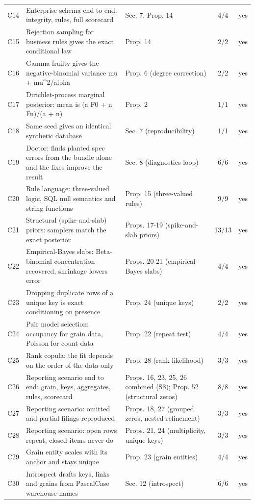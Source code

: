 \begin{longtable}{@{}l p{8.2cm} p{3.6cm} c r@{}}
C14 & Enterprise schema end to end: integrity, rules, full scorecard & Sec. 7, Prop. 14 & 4/4 & yes \\
C15 & Rejection sampling for business rules gives the exact conditional law & Prop. 14 & 2/2 & yes \\
C16 & Gamma frailty gives the negative-binomial variance mu + mu\^{}2/alpha & Prop. 6 (degree correction) & 2/2 & yes \\
C17 & Dirichlet-process marginal posterior: mean is (a F0 + n Fn)/(a + n) & Prop. 2 & 1/1 & yes \\
C18 & Same seed gives an identical synthetic database & Sec. 7 (reproducibility) & 1/1 & yes \\
C19 & Doctor: finds planted spec errors from the bundle alone and the fixes improve the result & Sec. 8 (diagnostics loop) & 6/6 & yes \\
C20 & Rule language: three-valued logic, SQL null semantics and string functions & Prop. 15 (three-valued rules) & 9/9 & yes \\
C21 & Structural (spike-and-slab) priors: samplers match the exact posterior & Props. 17-19 (spike-and-slab priors) & 13/13 & yes \\
C22 & Empirical-Bayes slabs: Beta-binomial concentration recovered, shrinkage lowers error & Props. 20-21 (empirical-Bayes slabs) & 4/4 & yes \\
C23 & Dropping duplicate rows of a unique key is exact conditioning on presence & Prop. 24 (unique keys) & 2/2 & yes \\
C24 & Pair model selection: occupancy for grain data, Poisson for count data & Prop. 22 (repeat test) & 4/4 & yes \\
C25 & Rank copula: the fit depends on the order of the data only & Prop. 28 (rank likelihood) & 3/3 & yes \\
C26 & Reporting scenario end to end: grain, keys, aggregates, rules, scorecard & Props. 16, 23, 25, 26 combined (S8); Prop. 52 (structural zeros) & 8/8 & yes \\
C27 & Reporting scenario: omitted and partial filings reproduced & Props. 18, 27 (grouped zeros, nested refinement) & 3/3 & yes \\
C28 & Reporting scenario: open rows repeat, closed items never do & Props. 21, 24 (multiplicity, unique keys) & 3/3 & yes \\
C29 & Grain entity scales with its anchor and stays unique & Prop. 23 (grain entities) & 4/4 & yes \\
C30 & Introspect drafts keys, links and grains from PascalCase warehouse names & Sec. 12 (introspect) & 6/6 & yes \\

\end{longtable}
